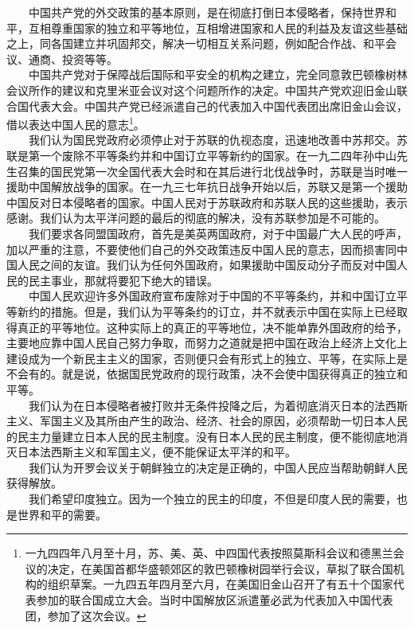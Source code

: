 \documentclass[cn,11pt,chinese]{elegantbook}
\begin{document}
　　中国共产党的外交政策的基本原则，是在彻底打倒日本侵略者，保持世界和平，互相尊重国家的独立和平等地位，互相增进国家和人民的利益及友谊这些基础之上，同各国建立并巩固邦交，解决一切相互关系问题，例如配合作战、和平会议、通商、投资等等。\\
　　中国共产党对于保障战后国际和平安全的机构之建立，完全同意敦巴顿橡树林会议所作的建议和克里米亚会议对这个问题所作的决定。中国共产党欢迎旧金山联合国代表大会。中国共产党已经派遣自己的代表加入中国代表团出席旧金山会议，借以表达中国人民的意志\footnote[28]{ 一九四四年八月至十月，苏、美、英、中四国代表按照莫斯科会议和德黑兰会议的决定，在美国首都华盛顿郊区的敦巴顿橡树园举行会议，草拟了联合国机构的组织草案。一九四五年四月至六月，在美国旧金山召开了有五十个国家代表参加的联合国成立大会。当时中国解放区派遣董必武为代表加入中国代表团，参加了这次会议。}。\\
　　我们认为国民党政府必须停止对于苏联的仇视态度，迅速地改善中苏邦交。苏联是第一个废除不平等条约并和中国订立平等新约的国家。在一九二四年孙中山先生召集的国民党第一次全国代表大会时和在其后进行北伐战争时，苏联是当时唯一援助中国解放战争的国家。在一九三七年抗日战争开始以后，苏联又是第一个援助中国反对日本侵略者的国家。中国人民对于苏联政府和苏联人民的这些援助，表示感谢。我们认为太平洋问题的最后的彻底的解决，没有苏联参加是不可能的。\\
　　我们要求各同盟国政府，首先是美英两国政府，对于中国最广大人民的呼声，加以严重的注意，不要使他们自己的外交政策违反中国人民的意志，因而损害同中国人民之间的友谊。我们认为任何外国政府，如果援助中国反动分子而反对中国人民的民主事业，那就将要犯下绝大的错误。\\
　　中国人民欢迎许多外国政府宣布废除对于中国的不平等条约，并和中国订立平等新约的措施。但是，我们认为平等条约的订立，并不就表示中国在实际上已经取得真正的平等地位。这种实际上的真正的平等地位，决不能单靠外国政府的给予，主要地应靠中国人民自己努力争取，而努力之道就是把中国在政治上经济上文化上建设成为一个新民主主义的国家，否则便只会有形式上的独立、平等，在实际上是不会有的。就是说，依据国民党政府的现行政策，决不会使中国获得真正的独立和平等。\\
　　我们认为在日本侵略者被打败并无条件投降之后，为着彻底消灭日本的法西斯主义、军国主义及其所由产生的政治、经济、社会的原因，必须帮助一切日本人民的民主力量建立日本人民的民主制度。没有日本人民的民主制度，便不能彻底地消灭日本法西斯主义和军国主义，便不能保证太平洋的和平。\\
　　我们认为开罗会议关于朝鲜独立的决定是正确的，中国人民应当帮助朝鲜人民获得解放。\\
　　我们希望印度独立。因为一个独立的民主的印度，不但是印度人民的需要，也是世界和平的需要。\\
\end{document}
